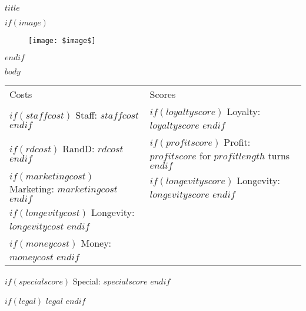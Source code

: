 \documentclass{article}
\begin{document}
  \begin{flushright}
    {$title$}
  \end{flushright}
  $if(image)$
  \begin{figure}[H]
      \centering
      \texttt{[image: \$image\$]}
  \end{figure}
  $endif$
  \begin{flushleft}
    \scriptsize{$body$}
  \end{flushleft}
  \scriptsize
  \begin{tabular}{ l l }
    Costs & Scores \\
    $if(staffcost)$ Staff: {$staffcost$} $endif$ & $if(loyaltyscore)$ Loyalty: {$loyaltyscore$} $endif$ \\
    $if(rdcost)$ RandD: {$rdcost$} $endif$ & $if(profitscore)$ Profit: {$profitscore$} for {$profitlength$} turns $endif$ \\
    $if(marketingcost)$ Marketing: {$marketingcost$} $endif$ & $if(longevityscore)$ Longevity: {$longevityscore$} $endif$ \\
    $if(longevitycost)$ Longevity: {$longevitycost$} $endif$ &  \\
    $if(moneycost)$ Money: {$moneycost$} $endif$ &
  \end{tabular}
  \begin{flushleft}
    $if(specialscore)$
    Special: {$specialscore$}
    $endif$
  \end{flushleft}
  \begin{center}
    $if(legal)$
    \tiny{$legal$}
    $endif$
  \end{center}
\end{document}
